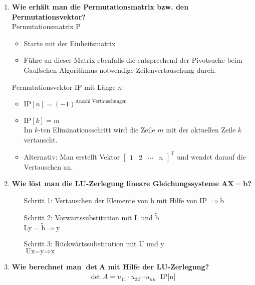 \begin{enumerate}
		\item \textbf{Wie erhält man die Permutationsmatrix bzw. den Permutationsvektor?} \\
		Permutationsmatrix P
			\begin{itemize}
				\item Starte mit der Einheitsmatrix
				\item Führe an dieser Matrix ebenfalls die entsprechend der Pivotsuche beim Gaußschen Algorithmus notwendige Zeilenvertauschung durch.
			\end{itemize}
		Permutationsvektor IP mit Länge \(n\)
			\begin{itemize}
				\item \(\text{IP}[n]=(-1)^{\text{Anzahl Vertauschungen}}\)
				\item \(\text{IP}[k]=m\) \\
					Im \(k\)-ten Eliminationsschritt wird die Zeile \(m\) mit der aktuellen Zeile \(k\) vertauscht.
				\item Alternativ: Man erstellt Vektor \(\begin{bmatrix}
				1 & 2 & \cdots & n
				\end{bmatrix}^\text{T}\) und wendet darauf die Vertauschen an.
			\end{itemize}
		
		\item \textbf{Wie löst man die LU-Zerlegung lineare Gleichungssysteme \(\mathbf{AX=b}\)?} \\
			\begin{enumerate}
				\item[Schritt 1:] Vertauschen der Elemente von b mit Hilfe von IP \(\Rightarrow\tilde{\text{b}}\)
				\item[Schritt 2:] Vorwärtssubstitution mit L und \(\tilde{\text{b}}\) \\
				\(\text{Ly}=\tilde{\text{b}}\Rightarrow\text{y}\)
				\item[Schritt 3:] Rückwärtssubstitution mit U und y \\
				\(\text{Ux=y}\Rightarrow \text{x}\)
			\end{enumerate}
		
		\item \textbf{Wie berechnet man \(\mathbf{\det A}\) mit Hilfe der LU-Zerlegung?} \\
			\begin{align*}
				\det{A}=u_{11}\cdot u_{22}\cdots u_{nn}\cdot\text{IP[n]}
			\end{align*}
		

\end{enumerate}
